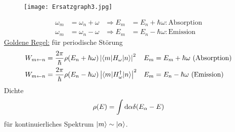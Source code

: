 		\begin{figure*} [tbp]
			\begin{center}
				\texttt{[image: Ersatzgraph3.jpg]}
			\end{center}
		\end{figure*}
	\FloatBarrier
		\begin{align*}
			\omega_m &= \omega_n + \omega &\Rightarrow E_m &= E_n + \hbar \omega: \text{Absorption} \\
			\omega_m &= \omega_n - \omega &\Rightarrow E_m &= E_n - \hbar \omega: \text{Emission}
		\end{align*}
		\underline{Goldene Regel:} für periodische Störung
		\begin{align*} 
		W_{m \leftarrow n} &= 
		\frac{2 \pi}{\hbar} \rho (E_n + \hbar \omega) \left|\braket{m | H_\omega | n}\right|^2 &
		E_m &= E_m + \hbar \omega \text{~(Absorption)} \\
		W_{m \leftarrow n} &= 
		\frac{2 \pi}{\hbar} \rho (E_n - \hbar \omega) \left| \braket{m | H_\omega^\dagger | n}\right|^2 &
		E_m &= E_n - \hbar \omega \text{~(Emission)}
		\end{align*} 
		Dichte
		\begin{align*}
		\rho (E) = \int \mathrm{d} \alpha \delta(E_\alpha - E)
		\end{align*}
		für kontinuierliches Spektrum $\ket{m} \sim \ket{\alpha}$.
		